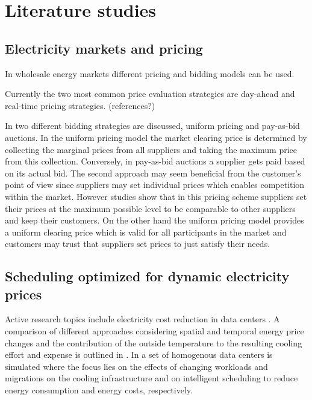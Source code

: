

\section{Literature studies}

\subsection{Electricity markets and pricing}

In wholesale energy markets different pricing and bidding models can be used. 

Currently the two most common price evaluation strategies are day-ahead and real-time pricing strategies. (references?)

In \cite{tierney2008uniform} two different bidding strategies are discussed, uniform pricing and pay-as-bid auctions. In the uniform pricing model the market clearing price is determined by collecting the marginal prices from all suppliers and taking the maximum price from this collection. Conversely, in pay-as-bid auctions a supplier gets paid based on its actual bid. 
The second approach may seem beneficial from the customer's point of view since suppliers may set individual prices which enables competition within the market. 
However studies show that in this pricing scheme suppliers set their prices at the maximum possible level to be comparable to other suppliers and keep their customers. On the other hand the uniform pricing model provides a uniform clearing price which is valid for all participants in the market and customers may trust that suppliers set prices to just satisfy their needs. 

\subsection{Scheduling optimized for dynamic electricity prices}

Active research topics include electricity cost reduction in data centers \cite{guler2013cutting, le2011reducing}. A comparison of different approaches considering spatial and temporal energy price changes and the contribution of the outside temperature to the resulting cooling effort and expense is outlined in \cite{guler2013cutting}. In \cite{le2011reducing} a set of homogenous data centers is simulated where the focus lies on the effects of changing workloads and migrations on the cooling infrastructure and on intelligent scheduling to reduce energy consumption and energy costs, respectively. 

